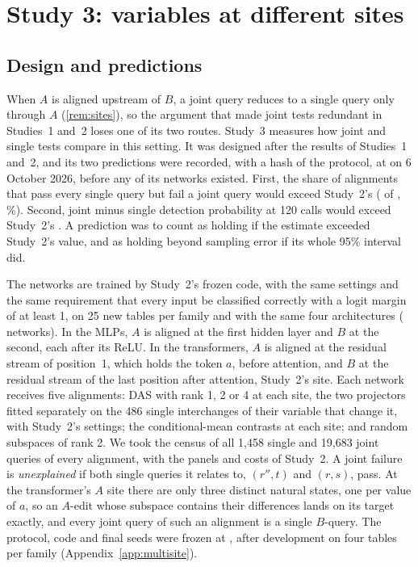 \section{Study 3: variables at different sites}\label{sec:multisite}

\subsection{Design and predictions}

When $A$ is aligned upstream of $B$, a joint query reduces to a single query only through $A$ (\cref{rem:sites}), so
the argument that made joint tests redundant in Studies~1 and~2 loses one of its two routes. Study~3 measures how joint
and single tests compare in this setting. It was designed after the results of Studies~1 and~2, and its two
predictions were recorded, with a hash of the protocol, at \MsPredictionsTime{} on 6 October 2026, before any of its
networks existed. First, the share of alignments that pass every single query but fail a joint query would exceed
Study~2's (\TrnPerfectJointFail{} of \TrnPerfect, \TrnPerfectShare\%). Second, joint minus single detection probability
at 120 calls would exceed Study~2's \TrnContrastOneTwenty. A prediction was to count as holding if the estimate exceeded Study~2's value, and as holding beyond sampling error if
its whole 95\% interval did.

The networks are trained by Study~2's frozen code, with the same settings and the same requirement that every input
be classified correctly with a logit margin of at least 1, on 25 new tables per family and with the same four
architectures (\MsNetworks{} networks). In the MLPs, $A$ is aligned at the first hidden
layer and $B$ at the second, each after its ReLU. In the transformers, $A$ is aligned at the residual stream of
position~1, which holds the token $a$, before attention, and $B$ at the residual stream of the last position after
attention, Study~2's site. Each network receives five alignments: DAS with rank 1, 2 or 4 at each site, the two
projectors fitted separately on the 486 single interchanges of their variable that change it, with Study~2's
settings; the conditional-mean contrasts at each site; and random subspaces of rank 2. We took the census of all
1,458 single and 19,683 joint queries of every alignment, with the panels and costs of Study~2. A joint failure is
\emph{unexplained} if both single queries it relates to, $(r'',t)$ and $(r,s)$, pass. At the transformer's $A$ site
there are only three distinct natural states, one per value of $a$, so an $A$-edit whose subspace contains their
differences lands on its target exactly, and every joint query of such an alignment is a single $B$-query. The
protocol, code and final seeds were frozen at \MsFreezeTime, after development on four tables per family
(Appendix~\ref{app:multisite}).

